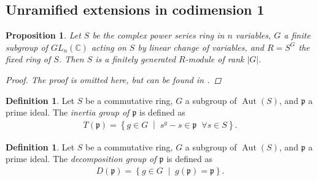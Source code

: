 \documentclass[11pt, a4paper, english]{article}
\newtheorem{prop}[theorem]{Proposition}
\theoremstyle{definition}
\newtheorem{defin}[theorem]{Definition}
\newcommand{\C}{\mathbb{C}}
\DeclareMathOperator{\Aut}{Aut}
\begin{document}
\subsection{Unramified extensions in codimension 1}

\begin{prop}
Let $S$ be the complex power series ring in $n$ variables, $G$  a finite subgroup of $GL_n(\C)$ acting on $S$ by linear change of variables, and $R = S^G$ the fixed ring of $S$. Then $S$ is a finitely generated $R$-module of rank $|G|$.

\begin{proof}
The proof is omitted here, but can be found in \cite[Proposition~5.4]{LW12}.
\end{proof}
\end{prop}

\begin{defin}
Let $S$ be a commutative ring, $G$ a subgroup of $\Aut(S)$, and $\mathfrak{p}$ a prime ideal. The \textit{inertia group of $\mathfrak{p}$} is defined as
\begin{align*}
T(\mathfrak{p}) = \left\lbrace g \in G \; \middle| \; s^g - s \in \mathfrak{p} \;\; \forall s \in S \right\rbrace.
\end{align*}
\end{defin}

\begin{defin}
Let $S$ be a commutative ring, $G$ a subgroup of $\Aut(S)$, and $\mathfrak{p}$ a prime ideal. The \textit{decomposition group of $\mathfrak{p}$} is defined as
\begin{align*}
D(\mathfrak{p}) = \left\lbrace g \in G \; \middle| \; g(\mathfrak{p}) = \mathfrak{p} \right\rbrace.
\end{align*}
\end{defin}
\end{document}

